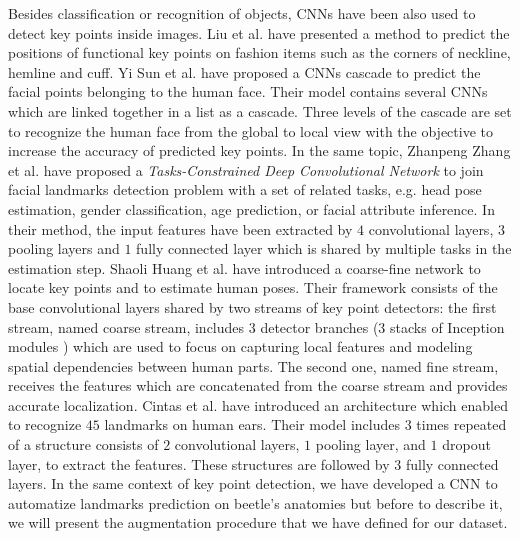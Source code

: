 \documentclass[review]{elsarticle}
\begin{document}
 
Besides classification or recognition of objects, CNNs have been also
used to detect key points inside images. Liu et
al. \cite{liu2016fashion} have presented a method to predict the
positions of functional key points on fashion items such as the
corners of neckline, hemline and cuff. Yi Sun et
al. \cite{sun2013deep} have proposed a CNNs cascade to predict the
facial points belonging to the human face. Their model contains several CNNs which are linked together in a list
as a cascade. Three levels of the cascade are set to recognize the
human face from the global to local view with the objective to
increase the accuracy of predicted key points. In the same topic,
Zhanpeng Zhang et al. \cite{zhang2014facial} have proposed a
\textit{Tasks-Constrained Deep Convolutional Network} to join facial
landmarks detection problem with a set of related tasks, e.g. head
pose estimation, gender classification, age prediction, or facial
attribute inference. In their method, the input features have been
extracted by $4$ convolutional layers, $3$ pooling layers and $1$
fully connected layer which is shared by  multiple tasks in the
estimation step. Shaoli Huang et al. \cite{huang2017coarse} have
introduced a coarse-fine network to locate key points and to estimate
human poses. Their framework consists of the base convolutional layers
shared by two streams of key point detectors: the first stream, named
coarse stream, includes $3$ detector branches (3 stacks of Inception
modules \cite{szegedy2015going}) which are used to focus on capturing
local features and modeling spatial dependencies between human
parts. The second one, named fine stream, receives the  features which
are concatenated from the coarse stream and provides accurate
localization. Cintas et al. \cite{cintas2016automatic} have introduced
an architecture which enabled to recognize $45$ landmarks on human
ears. Their model includes $3$ times repeated of a structure consists of $2$ convolutional layers,
$1$ pooling layer, and $1$ dropout layer, to extract the
features. These structures are followed by $3$
fully connected layers. In the same context of key point detection, we
have developed a CNN to automatize landmarks prediction on beetle's
anatomies but before to describe it, we will present the augmentation
procedure that we have defined for our dataset.



\end{document}
